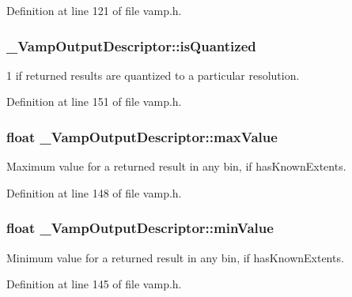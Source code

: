Definition at line 121 of file vamp.\+h.

\subsubsection[{\texorpdfstring{is\+Quantized}{isQuantized}}]{ \+\_\+\+Vamp\+Output\+Descriptor\+::is\+Quantized}\hypertarget{struct___vamp_output_descriptor_ab56cf0bbb17136819024574d5cc65e30}{}\label{struct___vamp_output_descriptor_ab56cf0bbb17136819024574d5cc65e30}
1 if returned results are quantized to a particular resolution. 

Definition at line 151 of file vamp.\+h.

\subsubsection[{\texorpdfstring{max\+Value}{maxValue}}]{\setlength{\rightskip}{0pt plus 5cm}float \+\_\+\+Vamp\+Output\+Descriptor\+::max\+Value}\hypertarget{struct___vamp_output_descriptor_a4cbe540a247df60f85b00b2aa16461ee}{}\label{struct___vamp_output_descriptor_a4cbe540a247df60f85b00b2aa16461ee}
Maximum value for a returned result in any bin, if has\+Known\+Extents. 

Definition at line 148 of file vamp.\+h.

\subsubsection[{\texorpdfstring{min\+Value}{minValue}}]{\setlength{\rightskip}{0pt plus 5cm}float \+\_\+\+Vamp\+Output\+Descriptor\+::min\+Value}\hypertarget{struct___vamp_output_descriptor_a9a28180989e3d028c12a98517479dc46}{}\label{struct___vamp_output_descriptor_a9a28180989e3d028c12a98517479dc46}
Minimum value for a returned result in any bin, if has\+Known\+Extents. 

Definition at line 145 of file vamp.\+h.


